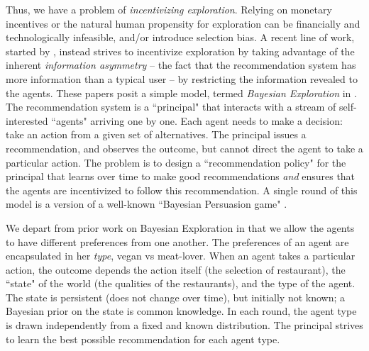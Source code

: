 Thus, we have a problem of \emph{incentivizing exploration}.
Relying on monetary incentives or the natural human propensity for exploration can be financially and technologically infeasible, and/or introduce selection bias.
%
%
A recent line of work, started by \cite{Kremer-JPE14}, instead strives to incentivize exploration by taking advantage of the inherent \emph{information asymmetry} -- the fact that the recommendation system has more information than a typical user -- by restricting the information revealed to the agents. These papers posit a simple model, termed \emph{Bayesian Exploration} in \cite{ICexplorationGames-ec16}. The recommendation system is a ``principal" that interacts with a stream of self-interested ``agents" arriving one by one. Each agent needs to make a decision: take an action from a given set of alternatives. The principal issues a recommendation, %
and observes the outcome, but cannot direct the agent to take a particular action. The problem is to design a ``recommendation policy" for the principal that learns over time to make good recommendations \emph{and} ensures that the agents are incentivized to follow this recommendation.
A single round of this model is a version of a well-known ``Bayesian Persuasion game" \cite{Kamenica-aer11}.

We depart from prior work on Bayesian Exploration in that we allow the agents to have different preferences from one another. The preferences of an agent are encapsulated in her {\em type}, \eg vegan vs meat-lover.
When an agent takes a particular action, the outcome depends the action itself (\eg the selection of restaurant), the ``state" of the world (\eg the qualities of the restaurants), and the type of the agent. The state is persistent (does not change over time), but initially not known; a Bayesian prior on the state is common knowledge. In each round, the agent type is drawn independently from a fixed and known distribution. The principal strives to learn the best possible recommendation for each agent type.

